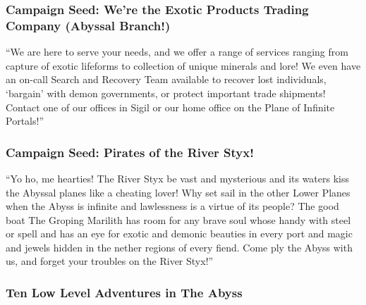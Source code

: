 \subsubsection{Campaign Seed: We're the Exotic Products Trading Company (Abyssal Branch!)}

``We are here to serve your needs, and we offer a range of services ranging from capture of exotic lifeforms to collection of unique minerals and lore! We even have an on-call Search and Recovery Team available to recover lost individuals, `bargain' with demon governments, or protect important trade shipments! Contact one of our offices in Sigil or our home office on the Plane of Infinite Portals!''

\subsubsection{Campaign Seed: Pirates of the River Styx!}

``Yo ho, me hearties! The River Styx be vast and mysterious and its waters kiss the Abyssal planes like a cheating lover! Why set sail in the other Lower Planes when the Abyss is infinite and lawlessness is a virtue of its people? The good boat The Groping Marilith has room for any brave soul whose handy with steel or spell and has an eye for exotic and demonic beauties in every port and magic and jewels hidden in the nether regions of every fiend. Come ply the Abyss with us, and forget your troubles on the River Styx!''

\subsubsection{Ten Low Level Adventures in The Abyss}

